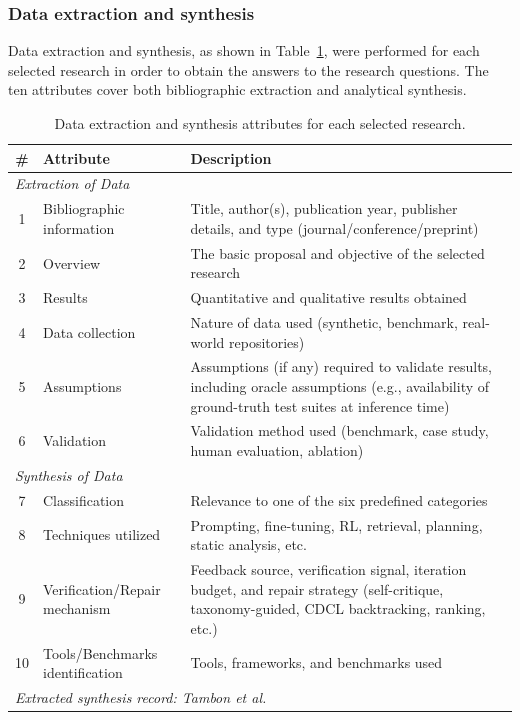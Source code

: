\documentclass[10pt,a4paper]{article}
\begin{document}
\subsubsection{Data extraction and synthesis}
\label{sec:data_extraction}
Data extraction and synthesis, as shown in Table~\ref{tab:data_extraction}, were performed for each selected research in order to obtain the answers to the research questions. The ten attributes cover both bibliographic extraction and analytical synthesis.

\begin{table}[!t]
\centering
\caption{Data extraction and synthesis attributes for each selected research.}
\label{tab:data_extraction}
\small
\begin{tabular}{@{}cp{4cm}p{9cm}@{}}
\toprule
\textbf{\#} & \textbf{Attribute} & \textbf{Description} \\
\midrule
\multicolumn{3}{l}{\textit{Extraction of Data}} \\
\midrule
1 & Bibliographic information & Title, author(s), publication year, publisher details, and type (journal/conference/preprint) \\
2 & Overview & The basic proposal and objective of the selected research \\
3 & Results & Quantitative and qualitative results obtained \\
4 & Data collection & Nature of data used (synthetic, benchmark, real-world repositories) \\
5 & Assumptions & Assumptions (if any) required to validate results, including oracle assumptions (e.g., availability of ground-truth test suites at inference time) \\
6 & Validation & Validation method used (benchmark, case study, human evaluation, ablation) \\
\midrule
\multicolumn{3}{l}{\textit{Synthesis of Data}} \\
\midrule
7 & Classification & Relevance to one of the six predefined categories \\
8 & Techniques utilized & Prompting, fine-tuning, RL, retrieval, planning, static analysis, etc. \\
9 & Verification/Repair mechanism & Feedback source, verification signal, iteration budget, and repair strategy (self-critique, taxonomy-guided, CDCL backtracking, ranking, etc.) \\
10 & Tools/Benchmarks identification & Tools, frameworks, and benchmarks used \\
\midrule
\multicolumn{3}{l}{\textit{Extracted synthesis record: Tambon et al.~\cite{tambon2025}}} \\

\end{tabular}
\end{table}
\end{document}
